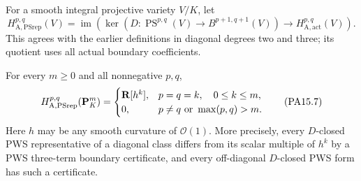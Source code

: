 \begin{definition}
\label{r15allps:group}
For a smooth integral projective variety $V/K$, let
\[
 H_{\mathrm A,\mathrm{PSrep}}^{p,q}(V)
   =\operatorname{im}\left(
       \ker(D:\operatorname{PS}^{p,q}(V)\to B^{p+1,q+1}(V))
        \longrightarrow H_{\mathrm A,\mathrm{act}}^{p,q}(V)
                         \right).
\tag{PA15.6}\label{r15allps:PSrep}
\]
This agrees with the earlier definitions in diagonal degrees
two and three; its quotient uses all actual boundary coefficients.
\end{definition}

\begin{theorem}
\label{r15allps:projective-space}
For every $m\geq0$ and all nonnegative $p,q$,
\[
 H_{\mathrm A,\mathrm{PSrep}}^{p,q}(\mathbf P_K^m)
   =
   \begin{cases}
      \mathbf R[h^k],&p=q=k,\quad 0\leq k\leq m,\\
      0,&p\ne q\ \hbox{or}\ \max(p,q)>m.
   \end{cases}
\tag{PA15.7}\label{r15allps:Pm}
\]
Here $h$ may be any smooth curvature of $\mathcal O(1)$.
More precisely, every $D$-closed PWS representative of a
diagonal class differs from its scalar multiple of $h^k$
by a PWS three-term boundary certificate, and every off-diagonal
$D$-closed PWS form has such a certificate.
\end{theorem}

